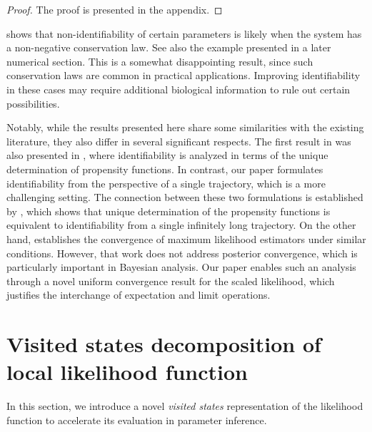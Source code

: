 \documentclass[pdflatex,sn-mathphys-num]{sn-jnl}%
\theoremstyle{thmstyleone}%
\theoremstyle{thmstyletwo}%
\theoremstyle{thmstylethree}%
\begin{document}
\begin{proof}
    {The proof is presented in the appendix}.
\end{proof}


 shows that non-identifiability of certain parameters is likely when the system has a non-negative conservation law.
See also the example presented in a later numerical section.
This is a somewhat disappointing result, since such conservation laws are common in practical applications.
Improving identifiability in these cases may require additional biological information to rule out certain possibilities.


Notably, while the results presented here share some similarities with the existing literature, they also differ in several significant respects. The first result in  was also presented in \cite{enciso2021identifiability}, where identifiability is analyzed in terms of the unique determination of propensity functions. In contrast, our paper formulates identifiability from the perspective of a single trajectory, which is a more challenging setting. The connection between these two formulations is established by , which shows that unique determination of the propensity functions is equivalent to identifiability from a single infinitely long trajectory.
On the other hand, \cite{zhang2019learning} establishes the convergence of maximum likelihood estimators under similar conditions. However, that work does not address posterior convergence, which is particularly important in Bayesian analysis. Our paper enables such an analysis through a novel uniform convergence result for the scaled likelihood, which justifies the interchange of expectation and limit operations.





\newpage

\section{Visited states decomposition of local likelihood function}
 


In this section, we introduce a novel \emph{visited states} representation of the likelihood function to accelerate its evaluation in parameter inference. 
\end{document}
